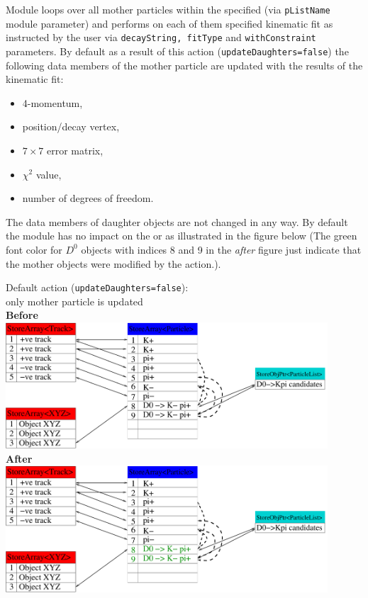 Module loops over all mother particles within the specified \pList (via {\tt pListName} module parameter) and performs on each of them specified
kinematic fit as instructed by the user via {\tt decayString, fitType} and {\tt withConstraint} parameters. By default as a result of this
action ({\tt updateDaughters=false}) the following data members of the mother particle are updated with the results of the kinematic fit:
\begin{itemize}
 \item 4-momentum,
 \item position/decay vertex,
 \item $7\times7$ error matrix,
 \item $\chi^2$ value,
 \item number of degrees of freedom.
\end{itemize}
The data members of daughter \particle objects are not changed in any way. By default the module has no impact 
on the  or  as illustrated in the figure below (The green font color  for $D^0$ \particle objects with indices 8 and 9
in the {\it after} figure just indicate that the mother \particle objects were modified by the action.).

\newpage
\begin{center}
 {\color{red} Default action ({\tt updateDaughters=false}):}\\
{\color{darkgreen} only mother particle is updated}\\
\vspace{0.2cm} 
{\bf\large Before}\\
\vspace{0.2cm}
\includegraphics[width=0.9\textwidth]{AnalysisModules/figs/vertexingDataStore.pdf}\\
\vspace{0.2cm}
{\bf\large After}\\
\vspace{0.2cm}
\includegraphics[width=0.9\textwidth]{AnalysisModules/figs/vertexingDataStoreB.pdf}
\end{center}

